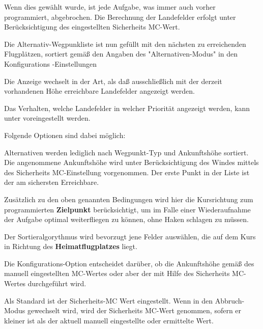 Wenn dies gewählt wurde,  ist jede Aufgabe, was immer auch vorher programmiert, abgebrochen.
Die Berechnung der Landefelder erfolgt unter Berücksichtigung des eingestellten Sicherheits MC-Wert.

 Die Alternativ-Wegpunkliste ist nun gefüllt mit den nächsten zu erreichenden Flugplätzen, sortiert gemäß den Angaben des  "Alternativen-Modus" in den Konfigurations -Einstellungen

Die Anzeige wechselt in der Art, als daß ausschließlich mit  der derzeit vorhandenen Höhe erreichbare
Landefelder angezeigt werden.

Das Verhalten, welche Landefelder in welcher Priorität angezeigt werden, kann  unter  voreingestellt werden.

Folgende Optionen sind dabei möglich:
\begin{description}
\item[\p{Einfach}] Alternativen werden lediglich nach Wegpunkt-Typ und Ankunftshöhe sortiert.
Die angenommene Ankunftshöhe wird unter Berücksichtigung des Windes mittels des Sicherheits  MC-Einstellung vorgenommen.
Der erste Punkt in der Liste  ist der am sichersten Erreichbare.
\item[\p{Aufgabe}] Zusätzlich zu den oben genannten Bedingungen wird hier die Kursrichtung zum programmierten \textbf{Zielpunkt} berücksichtigt, um im Falle einer
Wiederaufnahme der Aufgabe optimal weiterfliegen zu können, ohne Haken schlagen zu müssen.
\item[\p{Heimat}] Der Sortieralgorythmus wird bevorzugt jene Felder auswählen, die auf dem Kurs in Richtung des \textbf{Heimatflugplatzes} liegt.
\end{description}

Die Konfigurations-Option  entscheidet darüber,
ob die Ankunftshöhe gemäß des manuell eingestellten MC-Wertes oder aber der mit Hilfe des Sicherheits MC-Wertes durchgeführt wird.

Als Standard ist der Sicherheits-MC Wert eingestellt. 
Wenn in den Abbruch-Modus gewechselt wird, wird der Sicherheits MC-Wert genommen, sofern er kleiner ist als der aktuell
manuell eingestellte oder ermittelte Wert.

